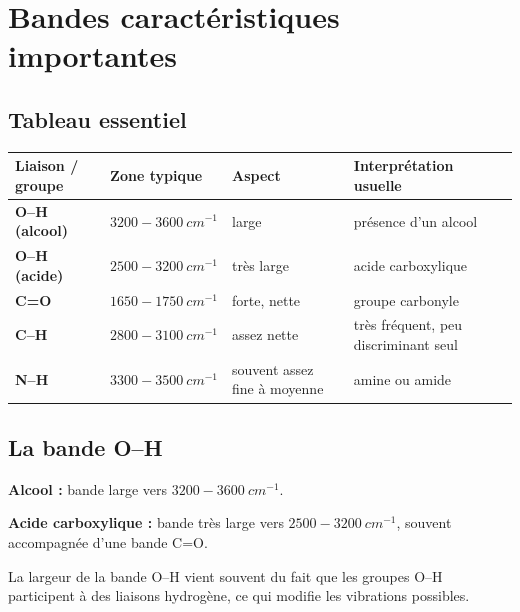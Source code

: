 \documentclass[11pt,a4paper]{article}
\begin{document}
\section{Bandes caractéristiques importantes}

\subsection{Tableau essentiel}

\begin{center}
\renewcommand{\arraystretch}{1.35}
\begin{tabular}{>{\bfseries}p{3.5cm} p{3.5cm} p{3.8cm} p{4cm}}
\toprule
Liaison / groupe & Zone typique & Aspect & Interprétation usuelle \\
\midrule
O--H (alcool) & \(3200-3600\ \si{cm^{-1}}\) & large & présence d’un alcool \\
O--H (acide) & \(2500-3200\ \si{cm^{-1}}\) & très large & acide carboxylique \\
C=O & \(1650-1750\ \si{cm^{-1}}\) & forte, nette & groupe carbonyle \\
C--H & \(2800-3100\ \si{cm^{-1}}\) & assez nette & très fréquent, peu discriminant seul \\
N--H & \(3300-3500\ \si{cm^{-1}}\) & souvent assez fine à moyenne & amine ou amide \\
\bottomrule
\end{tabular}
\end{center}

\subsection{La bande O--H}

\begin{exemplebox}
\textbf{Alcool :} bande large vers \(3200-3600\ \si{cm^{-1}}\).
\end{exemplebox}

\begin{exemplebox}
\textbf{Acide carboxylique :} bande très large vers \(2500-3200\ \si{cm^{-1}}\), souvent accompagnée d’une bande C=O.
\end{exemplebox}

\begin{comprendrebox}
La largeur de la bande O--H vient souvent du fait que les groupes O--H participent à des liaisons hydrogène, ce qui modifie les vibrations possibles.
\end{comprendrebox}
\end{document}
